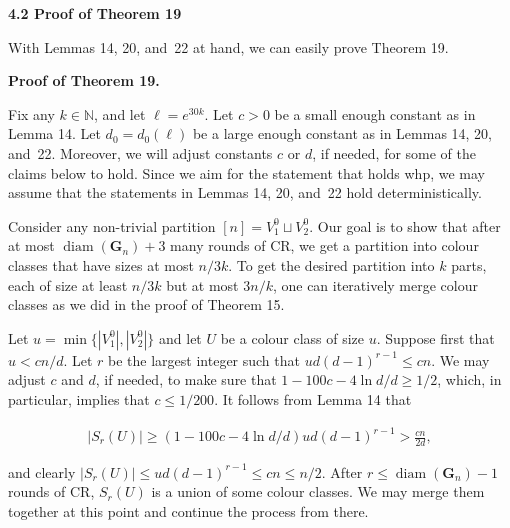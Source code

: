 \par\medskip\noindent\textbf{
4.2 Proof of Theorem 19
}\par




With Lemmas 14, 20, and 22 at hand, we can easily prove Theorem 19.\par




\par\medskip\noindent\textbf{Proof of Theorem 19.}\par




Fix any $k\in\mathbb{N}$, and let $\ell=e^{30k}$. Let $c>0$ be a small enough constant as in Lemma 14. Let $d_{0}=d_{0}(\ell)$ be a large enough constant as in Lemmas 14, 20, and 22. Moreover, we will adjust constants $c$ or $d$, if needed, for some of the claims below to hold. Since we aim for the statement that holds whp, we may assume that the statements in Lemmas 14, 20, and 22 hold deterministically.\par




Consider any non-trivial partition $[n]=V_{1}^{0}\sqcup V_{2}^{0}$. Our goal is to show that after at most $\operatorname{diam}(\mathbf{G}_{n})+3$ many rounds of CR, we get a partition into colour classes that have sizes at most $n/3k$. To get the desired partition into $k$ parts, each of size at least $n/3k$ but at most $3n/k$, one can iteratively merge colour classes as we did in the proof of Theorem 15.\par




Let $u=\min\{|V_{1}^{0}|,|V_{2}^{0}|\}$ and let $U$ be a colour class of size $u$. Suppose first that $u<cn/d$. Let $r$ be the largest integer such that $ud(d-1)^{r-1}\leq cn$. We may adjust $c$ and $d$, if needed, to make sure that $1-100c-4\ln d/d\geq 1/2$, which, in particular, implies that $c\leq 1/200$. It follows from Lemma 14 that\par


\[\begin{gathered}
|S_{r}(U)|\geq(1-100c-4\ln d/d)ud(d-1)^{r-1}>\frac{cn}{2d},
\end{gathered}\]


and clearly $|S_{r}(U)|\leq ud(d-1)^{r-1}\leq cn\leq n/2$. After $r\leq\operatorname{diam}(\mathbf{G}_{n})-1$ rounds of CR, $S_{r}(U)$ is a union of some colour classes. We may merge them together at this point and continue the process from there.\par




